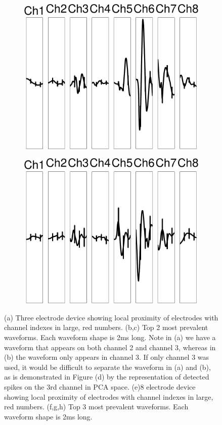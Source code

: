 \begin{center}
\begin{figure}
\begin{subfigure}[b]{.28\textwidth}
\includegraphics[width=\textwidth]{../figs/8devim/clus9}
\caption{}
\label{ex82}
\end{subfigure}
\begin{subfigure}[b]{.28\textwidth}
\includegraphics[width=\textwidth]{../figs/8devim/clus6}
\caption{}
\label{ex83}
\end{subfigure}
\caption{
(a) Three electrode device showing local proximity of electrodes with channel indexes in large, red numbers. (b,c) Top 2 most prevalent waveforms.  Each waveform shape is 2ms long.   Note in (a) we have a waveform that appears on both channel 2 and channel 3, whereas in (b) the waveform only appears in channel 3.  If only channel 3 was used, it would be difficult to separate the waveform in (a) and (b), as is demonstrated in Figure (d) by the representation of detected spikes on the 3rd channel in PCA space.
(e)8 electrode device showing local proximity of electrodes with channel indexes in large, red numbers. (f,g,h) Top 3 most prevalent waveforms.  Each waveform shape is 2ms long.
}
\end{figure}
\end{center}
